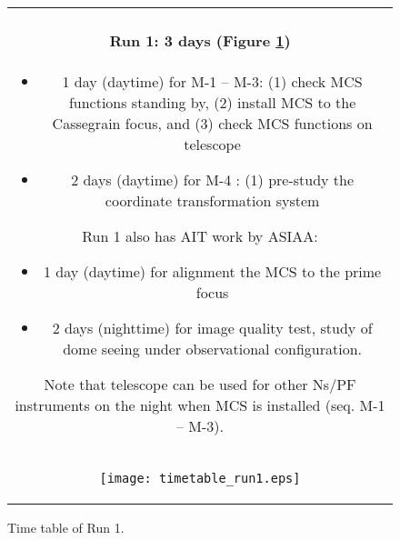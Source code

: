 \begin{figure}[!ht]
\begin{center}
\begin{tabular}{c}
\begin{minipage}{0.95\hsize}
\paragraph{Run 1: 3 days (Figure \ref{fig:run1})}
	\begin{itemize}
 	\item 1 day (daytime) for M-1 --  M-3: 
	(1) check MCS functions standing by,
	(2) install MCS to the Cassegrain focus, and
	(3) check MCS functions on telescope
 	\item 2 days (daytime) for M-4 : 
	(1) pre-study the coordinate transformation system
	\end{itemize}
Run 1 also has AIT work by ASIAA:
	\begin{itemize}
 	\item 1 day (daytime) for alignment the MCS to the prime focus
 	\item 2 days (nighttime) for image quality test, study of dome seeing under observational configuration.
	\end{itemize}
Note that telescope can be used for other Ns/PF instruments on the night when MCS is installed (seq. M-1 -- M-3).
\end{minipage} \\
\begin{minipage}{0.8\hsize}
	\begin{center}
	\vspace*{5mm}
	\texttt{[image: timetable\_run1.eps]}
	\end{center}
	\vspace*{-5mm}
	\caption{Time table of Run 1.}
	\label{fig:run1}
\end{minipage}
\end{tabular}
\end{center}
\end{figure}


